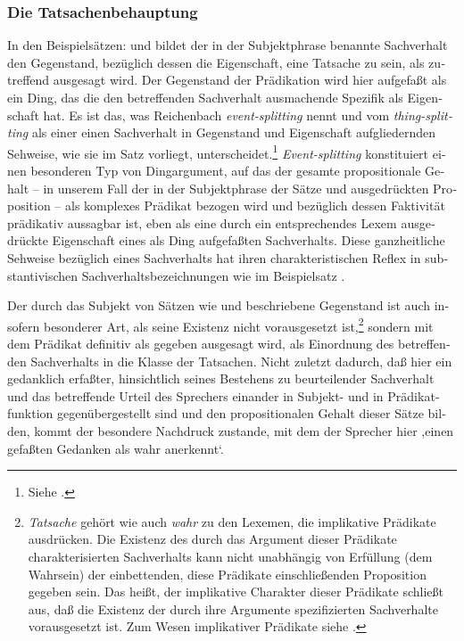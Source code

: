 \documentclass[output=paper]{langscibook}
\begin{document}
\begin{otherlanguage}{german}
\subsubsection{Die Tatsachenbehauptung} \label{sec:zi83:3.4.2}
\largerpage
In den Beispielsätzen:  und  bildet der in der Subjektphrase benannte Sachverhalt den Gegenstand, bezüglich dessen die Eigenschaft, eine Tatsache zu sein, als zutreffend ausgesagt wird. Der Gegenstand der Prädikation wird hier aufgefaßt als ein Ding, das die den betreffenden Sachverhalt ausmachende Spezifik als Eigenschaft hat. Es ist das, was Reichenbach %
\textit{event-splitting} nennt und vom \textit{thing-splitting} als einer einen Sachverhalt in Gegenstand und Eigenschaft aufgliedernden Sehweise, wie sie im Satz  vorliegt, unterscheidet.\footnote{Siehe \citet[286 ff.]{reichenbach1966elements-of-symbolic-logic}.} \textit{Event-splitting} konstituiert einen besonderen Typ von Dingargument, auf das der gesamte propositionale Gehalt -- in unserem Fall der in der Subjektphrase der Sätze  und  ausgedrückten Proposition -- als komplexes Prädikat bezogen wird und bezüglich dessen Faktivität prädikativ aussagbar ist, eben als eine durch ein entsprechendes Lexem ausgedrückte Eigenschaft eines als Ding aufgefaßten Sachverhalts. Diese ganzheitliche Sehweise bezüglich eines Sachverhalts hat ihren charakteristischen Reflex in substantivischen Sachverhaltsbezeichnungen wie im Beispielsatz .

Der durch das Subjekt von Sätzen wie  und  beschriebene Gegenstand ist auch insofern besonderer Art, als seine Existenz nicht vorausgesetzt ist,\footnote{\textit{Tatsache} gehört wie auch \textit{wahr} zu den Lexemen, die implikative Prädikate ausdrücken. Die Existenz des durch das Argument dieser Prädikate charakterisierten Sachverhalts kann nicht unabhängig von Erfüllung (dem Wahrsein) der einbettenden, diese Prädikate einschließenden Proposition gegeben sein. Das heißt, der implikative Charakter dieser Prädikate schließt aus, daß die Existenz der durch ihre Argumente spezifizierten Sachverhalte vorausgesetzt ist. Zum Wesen implikativer Prädikate siehe
\citet{karttunen1971implicative-verbs, karttunen1972die-logik-englischer-pradikatkomplementkonstruktionen}.} sondern mit dem Prädikat definitiv als gegeben ausgesagt wird, als Einordnung des betreffenden Sachverhalts in die Klasse der Tatsachen. Nicht zuletzt dadurch, daß hier ein gedanklich erfaßter, hinsichtlich seines Bestehens zu be\-ur\-tei\-len\-der Sachverhalt und das betreffende Urteil des Sprechers einander in Subjekt- und in Prädikatfunktion gegenübergestellt sind und den propositionalen Gehalt dieser Sätze bilden, kommt der besondere Nachdruck zustande, mit dem der Sprecher hier ,einen gefaßten Gedanken als wahr anerkennt‘.


\end{otherlanguage}
\end{document}
